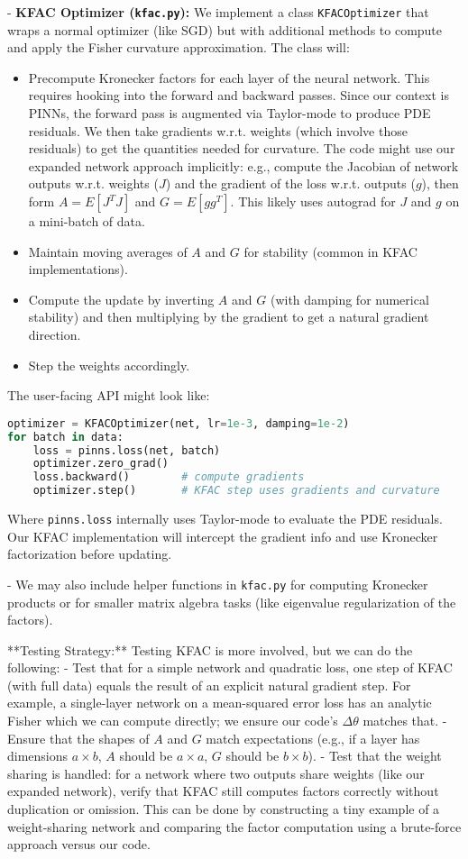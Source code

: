 \documentclass[11pt]{article}
\begin{document}
- \textbf{KFAC Optimizer (\texttt{kfac.py}):} We implement a class \texttt{KFACOptimizer} that wraps a normal optimizer (like SGD) but with additional methods to compute and apply the Fisher curvature approximation. The class will:
  \begin{itemize}
    \item Precompute Kronecker factors for each layer of the neural network. This requires hooking into the forward and backward passes. Since our context is PINNs, the forward pass is augmented via Taylor-mode to produce PDE residuals. We then take gradients w.r.t. weights (which involve those residuals) to get the quantities needed for curvature. The code might use our expanded network approach implicitly: e.g., compute the Jacobian of network outputs w.r.t. weights ($J$) and the gradient of the loss w.r.t. outputs ($g$), then form $A = E[J^T J]$ and $G = E[gg^T]$. This likely uses autograd for $J$ and $g$ on a mini-batch of data.
    \item Maintain moving averages of $A$ and $G$ for stability (common in KFAC implementations).
    \item Compute the update by inverting $A$ and $G$ (with damping for numerical stability) and then multiplying by the gradient to get a natural gradient direction.
    \item Step the weights accordingly.
  \end{itemize}
  The user-facing API might look like:
  \begin{lstlisting}[language=Python]
optimizer = KFACOptimizer(net, lr=1e-3, damping=1e-2)
for batch in data:
    loss = pinns.loss(net, batch)
    optimizer.zero_grad()
    loss.backward()        # compute gradients
    optimizer.step()       # KFAC step uses gradients and curvature
\end{lstlisting}
  Where \texttt{pinns.loss} internally uses Taylor-mode to evaluate the PDE residuals. Our KFAC implementation will intercept the gradient info and use Kronecker factorization before updating.
  
- We may also include helper functions in \texttt{kfac.py} for computing Kronecker products or for smaller matrix algebra tasks (like eigenvalue regularization of the factors).

**Testing Strategy:** Testing KFAC is more involved, but we can do the following:
  - Test that for a simple network and quadratic loss, one step of KFAC (with full data) equals the result of an explicit natural gradient step. For example, a single-layer network on a mean-squared error loss has an analytic Fisher which we can compute directly; we ensure our code's $\Delta \theta$ matches that.
  - Ensure that the shapes of $A$ and $G$ match expectations (e.g., if a layer has dimensions $a \times b$, $A$ should be $a \times a$, $G$ should be $b \times b$).
  - Test that the weight sharing is handled: for a network where two outputs share weights (like our expanded network), verify that KFAC still computes factors correctly without duplication or omission. This can be done by constructing a tiny example of a weight-sharing network and comparing the factor computation using a brute-force approach versus our code.
  
\end{document}
